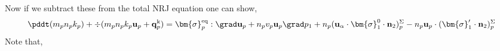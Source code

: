 Now if we subtract these from the total NRJ equation one can show, 
\begin{multline*}
    \pddt(m_p n_pk_p)
    + \div(m_pn_p k_p \textbf{u}_p 
    + \textbf{q}_p^\text{k})
    = 
     \bm{\sigma}_p^\text{eq}  :\grad \textbf{u}_p
     + n_p v_p \textbf{u}_p \grad p_1
     + n_p (\textbf{u}_\alpha \cdot \bm{\sigma}_1^0 \cdot  \textbf{n}_2)^\Sigma_p
     - n_p \textbf{u}_p \cdot (\bm{\sigma}_1' \cdot  \textbf{n}_2)^\Sigma_p
    \\
\end{multline*}
Note that, 















